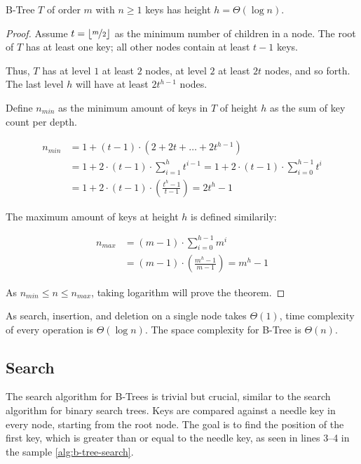\begin{lemma}
  B-Tree $T$ of order $m$ with $n \ge 1$ keys has height $h = \Theta(\log{n})$.
\end{lemma}

\begin{proof}
  Assume $t = \lfloor\nicefrac{m}{2}\rfloor$ as the minimum number of children in a node. The root of $T$ has at least one key; all other nodes contain at least $t - 1$ keys.

  Thus, $T$ has at level $1$ at least $2$ nodes, at level $2$ at least $2t$ nodes, and so forth. The last level $h$ will have at least $2t^{h-1}$ nodes.

  Define $n_{min}$ as the minimum amount of keys in $T$ of height $h$ as the sum of key count per depth.

  \begin{equation}
    \begin{split}
      n_{min} & = 1 + (t - 1) \cdot (2 + 2t + \dots + 2t^{h-1}) \\
      &= 1 + 2 \cdot (t - 1) \cdot \sum^{h}_{i = 1}{t^{i-1}} = 1 + 2 \cdot (t - 1) \cdot \sum^{h - 1}_{i = 0}{t^{i}} \\
      &= 1 + 2 \cdot (t - 1) \cdot (\frac{t^h - 1}{t - 1}) = 2t^h - 1
    \end{split}
  \end{equation}

  The maximum amount of keys at height $h$ is defined similarily:

  \begin{equation}
    \begin{split}
      n_{max} & = (m - 1) \cdot \sum^{h - 1}_{i = 0}{m^i} \\
      &= (m - 1) \cdot (\frac{m^h - 1}{m - 1}) = m^h - 1
    \end{split}
  \end{equation}

  As $n_{min} \le n \le n_{max}$, taking logarithm will prove the theorem.
\end{proof}

As search, insertion, and deletion on a single node takes $\Theta{(1)}$, time complexity of every operation is $\Theta{(\log{n})}$. The space complexity for B-Tree is $\Theta{(n)}$.

\subsection{Search}

The search algorithm for B-Trees is trivial but crucial, similar to the search algorithm for binary search trees. Keys are compared against a needle key in every node, starting from the root node. The goal is to find the position of the first key, which is greater than or equal to the needle key, as seen in lines 3--4 in the sample \cref{alg:b-tree-search}.

